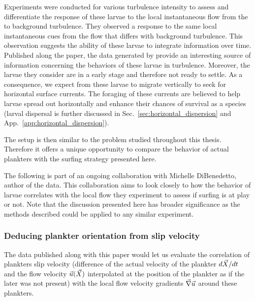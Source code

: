 Experiments were conducted for various turbulence intensity to assess and differentiate the response of these larvae to the local instantaneous flow from the to background turbulence.
They observed a response to the same local instantaneous cues from the flow that differs with background turbulence.
This observation suggests the ability of these larvae to integrate information over time.
Published along the paper, the data generated by \citet{dibenedetto2022responding} provide an interesting source of information concerning the behaviors of these larvae in turbulence.
Moreover, the larvae they consider are in a early stage and therefore not ready to settle.
As a consequence, we expect from these larvae to migrate vertically to seek for horizontal surface currents.
The foraging of these currents are believed to help larvae spread out horizontally and enhance their chances of survival as a species (larval dispersal is further discussed in Sec.~\ref{sec:horizontal_dispersion} and App.~\ref{app:horizontal_dispersion}).

The setup is then similar to the problem studied throughout this thesis.
Therefore it offers a unique opportunity to compare the behavior of actual plankters with the surfing strategy presented here.

The following is part of an ongoing collaboration with Michelle DiBenedetto, author of the data.
This collaboration aims to look closely to how the behavior of larvae correlates with the local flow they experiment to assess if surfing is at play or not.
Note that the discussion presented here has broader significance as the methods described could be applied to any similar experiment.

\subsubsection{Deducing plankter orientation from slip velocity}

The data published along with this paper would let us evaluate the correlation of plankters slip velocity (difference of the actual velocity of the plankter $d \vec{X} / dt$ and the flow velocity $\vec{u}(\vec{X})$ interpolated at the position of the plankter as if the later was not present) with the local flow velocity gradients $\vec{\nabla} \vec{u}$ around these plankters.

